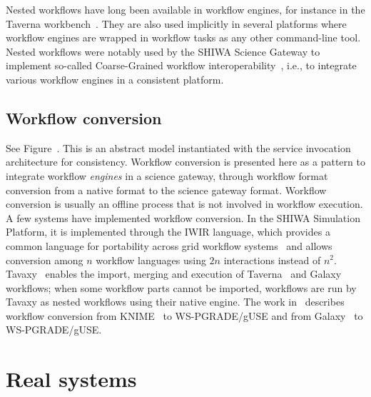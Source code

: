 \documentclass[preprint,3p,twocolumn]{elsarticle}
\newcommand{\correction}[1]{\color{blue}#1\color{black}\xspace}
\begin{document}
Nested workflows have long been available in workflow engines, for
instance in the Taverna workbench~\cite{oinn2004taverna}. They are
also used implicitly in several platforms where workflow engines are
wrapped in workflow tasks as any other command-line tool. Nested
workflows were notably used by the SHIWA Science Gateway to implement
so-called Coarse-Grained workflow
interoperability~\cite{terstyanszky2014enabling}, i.e., to integrate
various workflow engines in a consistent
platform. 

\subsection{Workflow conversion}

See Figure~. This is an abstract model
instantiated with the service invocation architecture for
consistency. \correction{Workflow conversion is presented here as a pattern to
integrate workflow \emph{engines} in a science gateway, through
workflow format conversion from a native format to the science gateway
format.} Workflow conversion is usually an offline process that is not
involved in workflow execution. A few systems have implemented
workflow conversion. In the SHIWA Simulation Platform, it is
implemented through the IWIR language, which provides a common
language for portability across grid workflow
systems~\cite{plankensteiner-prodan-etal:2013} and allows conversion
among $n$ workflow languages using $2n$ interactions instead of $n^2$.
Tavaxy~\cite{Abouelhoda2012} enables the import, merging and execution
of Taverna~\cite{oinn2004taverna} and Galaxy~\cite{goecks2010galaxy}
workflows; when some workflow parts cannot be imported, workflows are
run by Tavaxy as nested workflows using their native engine. The work
in~\cite{delaGarza2016} describes workflow conversion from
KNIME~\cite{Berthold2008} to WS-PGRADE/gUSE and from
Galaxy~\cite{goecks2010galaxy} to WS-PGRADE/gUSE.


\correction{\section{Real systems}}

\label{sec:real systems}
\end{document}
